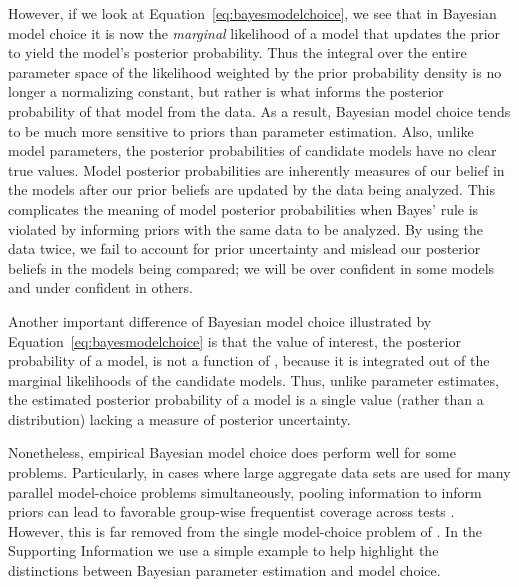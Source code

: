 
However, if we look at Equation~\ref{eq:bayesmodelchoice}, we see that in
Bayesian model choice it is now the \emph{marginal} likelihood of a model that
updates the prior to yield the model's posterior probability.
Thus the integral over the entire parameter space of the likelihood weighted by
the prior probability density is no longer a normalizing constant, but rather
is what informs the posterior probability of that model from the data.
As a result, Bayesian model choice tends to be much more sensitive to priors
than parameter estimation.
Also, unlike model parameters, the posterior probabilities of candidate
models have no clear true values.
Model posterior probabilities are inherently measures of our belief in the
models after our prior beliefs are updated by the data being analyzed.
This complicates the meaning of model posterior probabilities when Bayes' rule
is violated by informing priors with the same data to be analyzed.
By using the data twice, we fail to account for prior uncertainty and mislead
our posterior beliefs in the models being compared; we will be over confident
in some models and under confident in others.

Another important difference of Bayesian model choice illustrated by
Equation~\ref{eq:bayesmodelchoice} is that the value of interest, the
posterior probability of a model, is not a function of \myTheta{}, because
it is integrated out of the marginal likelihoods of the candidate models.
Thus, unlike parameter estimates, the estimated posterior probability of a
model is a single value (rather than a distribution) lacking a measure of
posterior uncertainty.

Nonetheless, empirical Bayesian model choice does perform well for some
problems.
Particularly, in cases where large aggregate data sets are used for many
parallel model-choice problems simultaneously, pooling information to inform
priors can lead to favorable group-wise frequentist coverage across tests
\citep{Efron2008}.
However, this is far removed from the single model-choice problem of \msb.
In the Supporting Information we use a simple example to help highlight the
distinctions between Bayesian parameter estimation and model choice.

